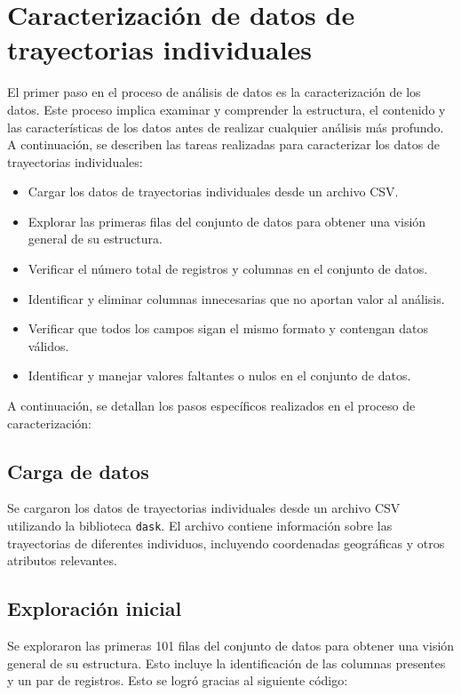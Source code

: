 \section{Caracterización de datos de trayectorias individuales}

\noindent El primer paso en el proceso de análisis de datos es la caracterización de los datos. Este proceso implica examinar y comprender la estructura, el contenido y las características de los datos antes de realizar cualquier análisis más profundo. A continuación, se describen las tareas realizadas para caracterizar los datos de trayectorias individuales:
\begin{itemize}
    \item Cargar los datos de trayectorias individuales desde un archivo CSV.
    \item Explorar las primeras filas del conjunto de datos para obtener una visión general de su estructura.
    \item Verificar el número total de registros y columnas en el conjunto de datos.
    \item Identificar y eliminar columnas innecesarias que no aportan valor al análisis.
    \item Verificar que todos los campos sigan el mismo formato y contengan datos válidos.
    \item Identificar y manejar valores faltantes o nulos en el conjunto de datos.

\end{itemize}
\noindent A continuación, se detallan los pasos específicos realizados en el proceso de caracterización:

\subsection{Carga de datos}
\noindent Se cargaron los datos de trayectorias individuales desde un archivo CSV utilizando la biblioteca \texttt{dask}. El archivo contiene información sobre las trayectorias de diferentes individuos, incluyendo coordenadas geográficas y otros atributos relevantes. 

\subsection{Exploración inicial}
\noindent Se exploraron las primeras 101 filas del conjunto de datos para obtener una visión general de su estructura. Esto incluye la identificación de las columnas presentes y un par de registros. Esto se logró gracias al siguiente código:

